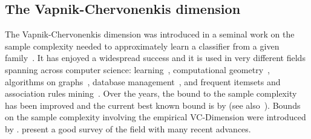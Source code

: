 %
%
%
%


\subsection{The Vapnik-Chervonenkis dimension}
The Vapnik-Chervonenkis dimension was introduced in a seminal
work on the sample complexity needed to approximately learn a classifier from a
given family~\citep{VapnikC71}. It has enjoyed a widespread success and it is
used in very different fields spanning across computer science:
learning~\citep{BlumerEHW89}, computational
geometry~\citep{AlonS08,Chazelle00,Matousek02},
algorithms on graphs~\citep{AbrahamDFGW11,KleinbergSS04}, database
management~\citep{RiondatoACZU11}, and frequent itemsets and association rules
mining~\citep{RiondatoU12}. Over the years, the bound to the sample complexity
has been improved and the current best known bound is by \citet{LiLS01}
(see also~\citep{HarPS11}). Bounds on the sample complexity involving the
empirical VC-Dimension were introduced by \citet{BartlettBL02}.
\citet{BoucheronBL05} present a good survey of the field with
many recent advances.

